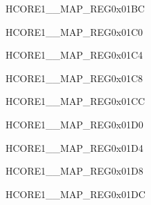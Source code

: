 \begin{register}{H}{CORE1\_\_MAP\_REG}{0x01BC}\label{regdesc:CORE1PCNTINTMAPREG}
\end{register}\vspace{-3em}


\begin{register}{H}{CORE1\_\_MAP\_REG}{0x01C0}\label{regdesc:CORE1HPPAUINTMAPREG}
\end{register}\vspace{-3em}


\begin{register}{H}{CORE1\_\_MAP\_REG}{0x01C4}\label{regdesc:CORE1HPPARLIORXINTMAPREG}
\end{register}\vspace{-3em}


\begin{register}{H}{CORE1\_\_MAP\_REG}{0x01C8}\label{regdesc:CORE1HPPARLIOTXINTMAPREG}
\end{register}\vspace{-3em}


\begin{register}{H}{CORE1\_\_MAP\_REG}{0x01CC}\label{regdesc:CORE1H264DMA2DOUTCH0INTMAPREG}
\end{register}\vspace{-3em}


\begin{register}{H}{CORE1\_\_MAP\_REG}{0x01D0}\label{regdesc:CORE1H264DMA2DOUTCH1INTMAPREG}
\end{register}\vspace{-3em}


\begin{register}{H}{CORE1\_\_MAP\_REG}{0x01D4}\label{regdesc:CORE1H264DMA2DOUTCH2INTMAPREG}
\end{register}\vspace{-3em}


\begin{register}{H}{CORE1\_\_MAP\_REG}{0x01D8}\label{regdesc:CORE1H264DMA2DOUTCH3INTMAPREG}
\end{register}\vspace{-3em}


\begin{register}{H}{CORE1\_\_MAP\_REG}{0x01DC}\label{regdesc:CORE1H264DMA2DOUTCH4INTMAPREG}
\end{register}\vspace{-3em}


